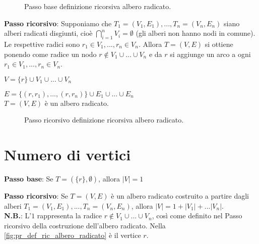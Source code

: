 \begin{figure}[H]
    \centering
    \caption{Passo base definizione ricorsiva albero radicato.}
    \label{fig:pb_def_ric_albero_radicato}
\end{figure}

\textbf{Passo ricorsivo}: Supponiamo che $T_1=(V_1, E_1), ..., T_n=(V_n, E_n)$ siano alberi radicati disgiunti, cioè $\displaystyle\bigcap^n_{i=1} V_i = \emptyset$ (gli alberi non hanno nodi in comune). Le respettive radici sono $r_1 \in V_1, ..., r_n \in V_n$.
Allora $T=(V, E)$ si ottiene ponendo come radice un nodo $r \not\in V_1 \cup ... \cup V_n$ e da $r$ si aggiunge un arco a ogni $r_1 \in V_1, ..., r_n \in V_n$. 

$V = \{r\} \cup V_1 \cup ... \cup V_n$

$E = \{(r, r_1), ..., (r, r_n)\} \cup E_1 \cup ... \cup E_n$ \\
$T = (V, E)$ è un albero radicato.

\begin{figure}[H]
    \centering
    \caption{Passo ricorsivo definizione ricorsiva albero radicato.}
    \label{fig:pr_def_ric_albero_radicato}
\end{figure}

\section{Numero di vertici}
\textbf{Passo base}: Se $T=(\{r\}, \emptyset)$, allora $|V|=1$

\textbf{Passo ricorsivo}: Se $T=(V, E)$ è un albero radicato costruito a partire dagli alberi $T_1=(V_1, E_1), ..., T_n=(V_n, E_n)$, allora $|V| = 1 + |V_1| + ... |V_n|$. \\
\textbf{N.B.}: L'$1$ rappresenta la radice $r \not\in V_1 \cup ... \cup V_n$, così come definito nel Passo ricorsivo della costruzione dell'albero radicato. Nella \autoref{fig:pr_def_ric_albero_radicato} è il vertice $r$.


